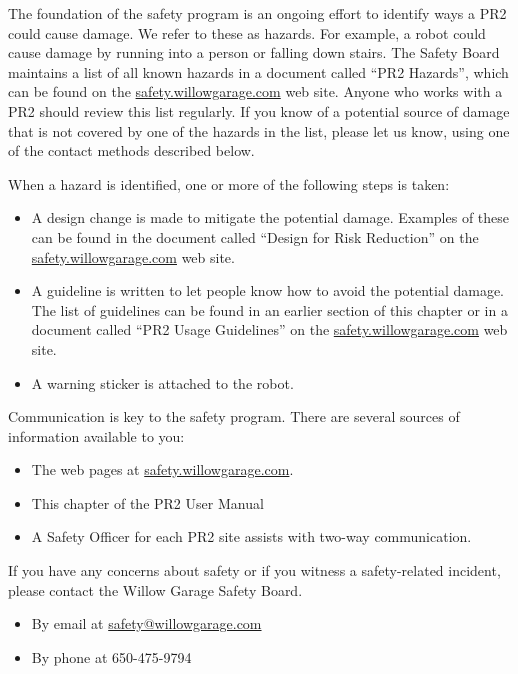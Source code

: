 The foundation of the safety program is an ongoing effort to identify ways a PR2 could cause damage. We refer to these as hazards. For example, a robot could cause damage by running into a person or falling down stairs. The Safety Board maintains a list of all known hazards in a document called “PR2 Hazards”, which can be found on the \href{http://safety.willowgarage.com}{safety.willowgarage.com} web site. Anyone who works with a PR2 should review this list regularly. If you know of a potential source of damage that is not covered by one of the hazards in the list, please let us know, using one of the contact methods described below.

When a hazard is identified, one or more of the following steps is taken:

\begin{itemize}
\item A design change is made to mitigate the potential damage. Examples of these can be found in the document called “Design for Risk Reduction” on the \href{http://safety.willowgarage.com}{safety.willowgarage.com} web site.
\item A guideline is written to let people know how to avoid the potential damage. The list of guidelines can be found in an earlier section of this chapter or in a document called “PR2 Usage Guidelines” on the \href{http://safety.willowgarage.com}{safety.willowgarage.com} web site.
\item A warning sticker is attached to the robot.
\end{itemize}

Communication is key to the safety program. There are several sources of information available to you:

\begin{itemize}
\item The web pages at \href{http://safety.willowgarage.com}{safety.willowgarage.com}.
\item This chapter of the PR2 User Manual
\item A Safety Officer for each PR2 site assists with two-way communication.
\end{itemize}

If you have any concerns about safety or if you witness a safety-related incident, please contact the Willow Garage Safety Board.

\begin{itemize}
\item By email at \href{mailto://safety@willowgarage.com}{safety@willowgarage.com}
\item By phone at 650-475-9794
\end{itemize}
